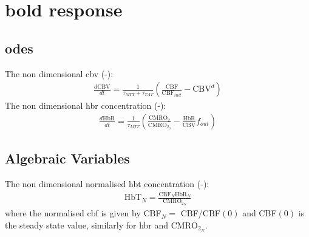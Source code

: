 \documentclass[11pt]{elsarticle}
\begin{document}
\section{\Gls{bold} response}

\subsection{\Glspl{ode}}
The non dimensional \gls{cbv} (-):
\begin{align}
\frac{d \text{CBV}}{dt} = \frac{1}{\tau_{MTT} + \tau_{TAT}} \left( \frac{\text{CBF}}{\text{CBF}_{init}} - \text{CBV}^{d} \right)
\end{align}
%	
The non dimensional \gls{hbr} concentration (-):
\begin{align}
\frac{d \text{HbR}}{dt} = \frac{1}{\tau_{MTT}} \left(  \frac{\text{CMRO}_2}{\text{CMRO}_{2_{0}}}
- \frac{\text{HbR}}{\text{CBV}} f_{out} 
\right)
\end{align}
%
\subsection{Algebraic Variables}	
The non dimensional normalised \gls{hbt} concentration (-):	
\begin{align}
\text{HbT}_N = \frac{ \text{CBF}_N \text{HbR}_N }{\text{CMRO}_{2_N} }
\end{align}
%
where the normalised \gls{cbf} is given by CBF$_N = $ CBF/CBF$(0)$ and CBF$(0)$ is the steady state value, similarly for \gls{hbr} and $\text{CMRO}_{2_N}$.
\end{document}
